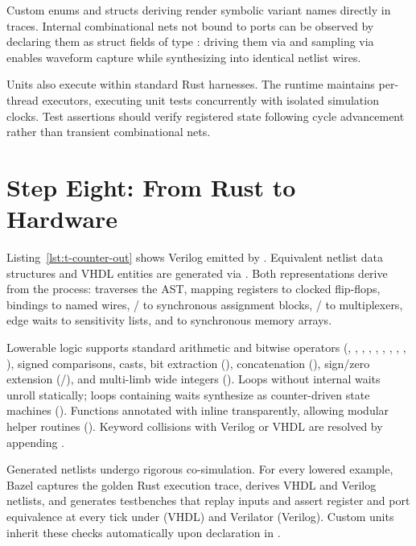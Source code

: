 \documentclass[journal,9pt]{IEEEtran}
\begin{document}
Custom enums and structs deriving  render symbolic variant names
directly in traces. Internal combinational nets not bound to ports can be
observed by declaring them as struct fields of type : driving them
via  and sampling via  enables waveform capture while
synthesizing into identical netlist wires.

Units also execute within standard Rust \code{\#[test]} harnesses. The runtime
maintains per-thread executors, executing unit tests concurrently with isolated
simulation clocks. Test assertions should verify registered state following
cycle advancement rather than transient combinational nets.

\section{Step Eight: From Rust to Hardware}
\label{sec:t-netlist}

Listing~\ref{lst:t-counter-out} shows Verilog emitted by
. Equivalent netlist data structures and VHDL
entities are generated via . Both
representations derive from the  process: \code{\#[lower]} traverses
the AST, mapping registers to clocked flip-flops,  bindings to named
wires, / to synchronous assignment blocks,
/ to multiplexers, edge waits to sensitivity lists, and
 to synchronous memory arrays.

Lowerable logic supports standard arithmetic and bitwise operators (\code{+},
\code{-}, \code{*}, \code{\%}, \code{\&}, \code{|}, \code{\^{}}, \code{!},
\code{<<}, \code{>>}), signed comparisons,  casts, bit extraction
(), concatenation (), sign/zero extension
(/), and multi-limb wide integers (). Loops
without internal waits unroll statically; loops containing waits synthesize as
counter-driven state machines (). Functions annotated with
\code{\#[lower]} inline transparently, allowing modular helper routines
(). Keyword collisions with Verilog or VHDL are resolved by
appending .

Generated netlists undergo rigorous co-simulation. For every lowered example,
Bazel captures the golden Rust execution trace, derives VHDL and Verilog
netlists, and generates testbenches that replay inputs and assert register and
port equivalence at every tick under  (VHDL) and Verilator (Verilog).
Custom units inherit these checks automatically upon declaration in
.
\end{document}
